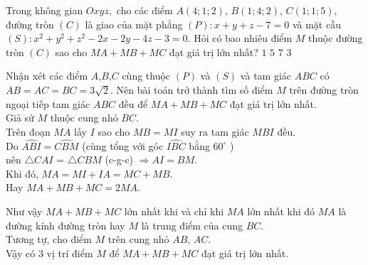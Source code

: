 \begin{ex}%
	Trong không gian $ Oxyz, $ cho các điểm $ A(4;1;2) $, $ B(1;4;2) $, $ C(1;1;5) $, đường tròn $ (C) $ là giao của mặt phẳng $ (P) \colon x + y + z - 7 = 0 $ và mặt cầu $ (S) \colon x^2 + y^2 +z^2 - 2x - 2y - 4z - 3 = 0 $. Hỏi có bao nhiêu điểm $ M $ thuộc đường tròn $ (C) $ sao cho $ MA + MB + MC  $ đạt giá trị lớn nhất?
	\choice
	{$ 1 $}
	{$ 5 $}
	{$ 7 $}
	{\True $ 3 $}
	\loigiai
{\immini
	{Nhận xét các điểm $ A$,$ B $,$C $ cùng thuộc $ (P) $ và $ (S) $ và tam giác $ ABC $ có $ AB = AC = BC = 3\sqrt{2} $. Nên bài toán trở thành tìm số điểm $ M $ trên đường tròn ngoại tiếp tam giác $ ABC $ đều để $ MA + MB + MC $ đạt giá trị lớn nhất.
\\
Giả sử $ M $ thuộc cung nhỏ $ BC $. \\
Trên đoạn $ MA $ lấy $ I $ sao cho $ MB = MI $ suy ra tam giác $ MBI $ đều.\\
Do $\widehat{ABI} = \widehat{CBM}  $
(cùng tổng với góc $ \widehat{IBC}  $ bằng $ 60^\circ  $ ) \\
nên $\triangle CAI $ = $ \triangle CBM $ (c-g-c)
 $ \Rightarrow AI = BM $.\\
Khi đó, $ MA = MI + IA = MC + MB. $
\\Hay $ MA + MB + MC = 2MA. $
	}
	{
	}
Như vậy $ MA + MB + MC $ lớn nhất khi và chỉ khi $ MA $ lớn nhất khi đó $ MA $ là đường kính đường tròn hay $ M $ là trung điểm của cung $ BC $.\\
Tương tự, cho điểm $ M $ trên cung nhỏ $ AB $, $ AC $.\\
Vậy có $ 3 $ vị trí điểm $ M $ để $ MA + MB + MC $ đạt giá trị lớn nhất.

}
\end{ex}

